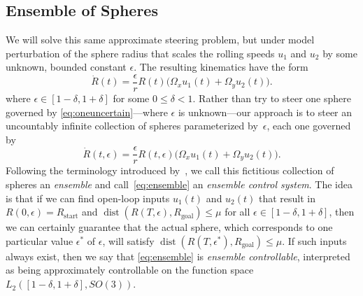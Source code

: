 \documentclass[letter paper, 10pt, conference]{ieeeconf}
\newcommand{\Rstart}{R_\text{start}}
\newcommand{\Rgoal}{R_\text{goal}}
\begin{document}
    

\subsection{Ensemble of Spheres}

We will solve this same approximate steering problem, but under model perturbation of the sphere radius that scales the rolling speeds $u_{1}$ and $u_{2}$ by some unknown, bounded constant $\epsilon$. The resulting kinematics have the form
\begin{equation}
\label{eq:oneuncertain}
\dot{R}(t) = \frac{\epsilon}{r}  R(t) \bigg(  \Omega_x  u_1(t) + \Omega_y u_2(t) \bigg).
\end{equation}
where $\epsilon \in [1-\delta, 1+\delta]$ for some $0 \leq \delta < 1$. Rather than try to steer one sphere governed by \eqref{eq:oneuncertain}---where $\epsilon$ is unknown---our approach is to steer an uncountably infinite collection of spheres parameterized by~$\epsilon$, each one governed by
\begin{equation} \label{eq:ensemble}
\dot{R}(t,\epsilon) = \frac{\epsilon}{r}  R(t,\epsilon) \bigg( \Omega_x u_1(t) + \Omega_y u_2(t) \bigg).
\end{equation}
Following the terminology introduced  %
by~\cite{Brockett1999,Li2009,Li2011}, we call this fictitious collection of spheres an {\em ensemble} and call~\eqref{eq:ensemble} an {\em ensemble control system}.
The idea is that if we can find
open-loop inputs $u_{1}(t)$ and $u_{2}(t)$ that result in $R(0,\epsilon)=\Rstart$ and
$\operatorname{dist}\!\left(R(T,\epsilon),\Rgoal\right)\leq\mu$
for all $\epsilon \in [1-\delta,1+\delta]$, then we can certainly guarantee that the actual sphere, which corresponds to one particular value $\epsilon^{\ast}$ of $\epsilon$, will satisfy $\operatorname{dist}\!\left(R(T,\epsilon^{\ast}),\Rgoal\right)\leq\mu$.
If such inputs always exist, then we say that \eqref{eq:ensemble} is {\em ensemble controllable},
interpreted as being approximately controllable on the function space $L_{2}\left([1-\delta,1+\delta],SO(3)\right)$.
\end{document}
